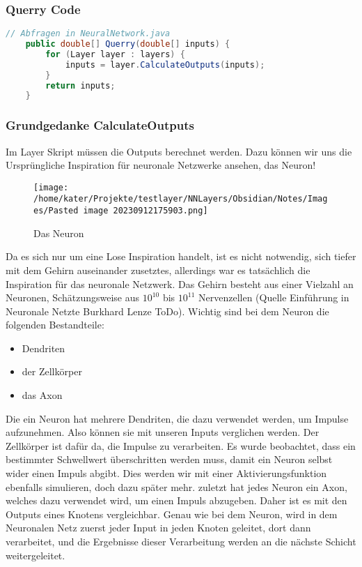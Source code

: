 \documentclass[12pt]{article}
\begin{document}
\subsubsection{Querry Code}
\begin{lstlisting}[language=Java]
// Abfragen in NeuralNetwork.java
    public double[] Querry(double[] inputs) {
        for (Layer layer : layers) {
            inputs = layer.CalculateOutputs(inputs);
        }
        return inputs;
    }
\end{lstlisting}

\subsubsection{Grundgedanke CalculateOutputs}
Im Layer Skript müssen die Outputs berechnet werden. Dazu können wir uns die Ursprüngliche Inspiration für neuronale Netzwerke ansehen, das Neuron!
\begin{figure}[htp]
\centering
\texttt{[image: /home/kater/Projekte/testlayer/NNLayers/Obsidian/Notes/Images/Pasted image 20230912175903.png]}
\caption{Das Neuron}
\label{Was kommt hier rein?}
\end{figure}

Da es sich nur um eine Lose Inspiration handelt, ist es nicht notwendig, sich tiefer mit dem Gehirn auseinander zusetztes, allerdings war es tatsächlich die Inspiration für das neuronale Netzwerk. Das Gehirn besteht aus einer Vielzahl an Neuronen, Schätzungsweise aus \(10^{10}\) bis \(10^{11}\) Nervenzellen (Quelle Einführung in Neuronale Netzte Burkhard Lenze ToDo).
Wichtig sind bei dem Neuron die folgenden Bestandteile:

\begin{itemize}
    \item Dendriten
    \item der Zellkörper
    \item das Axon
\end{itemize}

Die ein Neuron hat mehrere Dendriten, die dazu verwendet werden, um Impulse aufzunehmen. Also können sie mit unseren Inputs verglichen werden. Der Zellkörper ist dafür da, die Impulse zu verarbeiten. Es wurde beobachtet, dass ein bestimmter Schwellwert überschritten werden muss, damit ein Neuron selbst wider einen Impuls abgibt. Dies werden wir mit einer Aktivierungsfunktion ebenfalls simulieren, doch dazu später mehr. zuletzt hat jedes Neuron ein Axon, welches dazu verwendet wird, um einen Impuls abzugeben. Daher ist es mit den Outputs eines Knotens vergleichbar.
Genau wie bei dem Neuron, wird in dem Neuronalen Netz zuerst jeder Input in jeden Knoten geleitet, dort dann verarbeitet, und die Ergebnisse dieser Verarbeitung werden an die nächste Schicht weitergeleitet.
\end{document}

